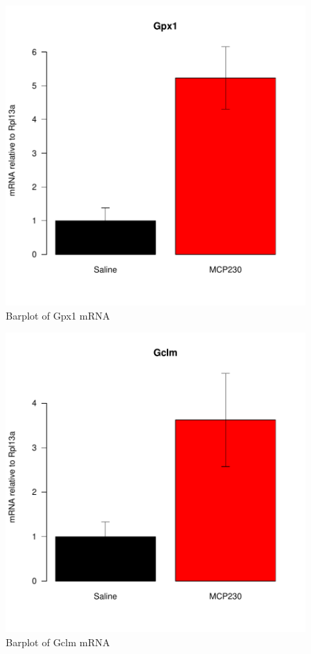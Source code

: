 \documentclass{article}
\begin{document}
\begin{figure}
\begin{center}
\includegraphics{MaternalParticulateAntioxDefense-barplotGpx1}
\end{center}
\caption{Barplot of Gpx1 mRNA}
\label{fig:barplotGpx1}
\end{figure}

\begin{figure}
\begin{center}
\includegraphics{MaternalParticulateAntioxDefense-barplotGclm}
\end{center}
\caption{Barplot of Gclm mRNA}
\label{fig:barplotGclm}
\end{figure}
\end{document}
